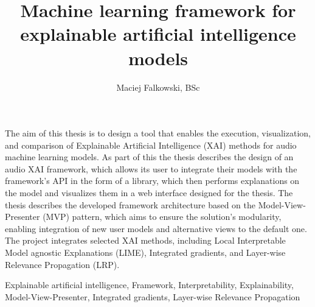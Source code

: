\documentclass[
    bindingoffset=5mm,  %
    footnoteindent=3mm, %
    hyphenation=true    %
]{src/wut-thesis}
\begin{document}
\title{
    Machine learning framework for explainable artificial intelligence models
}
\author{Maciej Falkowski, BSc}
\date{\the\year}
\maketitle

\cleardoublepage %
\abstract

The aim of this thesis is to design a tool that enables the execution, visualization, and comparison of
Explainable Artificial Intelligence (XAI) methods for audio machine learning models. As part of this
the thesis describes the design of an audio XAI framework, which allows its user to integrate their models
with the framework's API in the form of a library, which then performs explanations on the model and visualizes
them in a web interface designed for the thesis. The thesis describes the developed framework architecture
based on the Model-View-Presenter (MVP) pattern, which aims to ensure the solution's modularity, enabling
integration of new user models and alternative views to the default one. The project integrates selected
XAI methods, including Local Interpretable Model agnostic Explanations (LIME), Integrated gradients,
and Layer-wise Relevance Propagation (LRP).

\keywords Explainable artificial intelligence, Framework, Interpretability, Explainability, Model-View-Presenter, Integrated gradients, Layer-wise Relevance Propagation

\clearpage
\secondabstract
\end{document}
